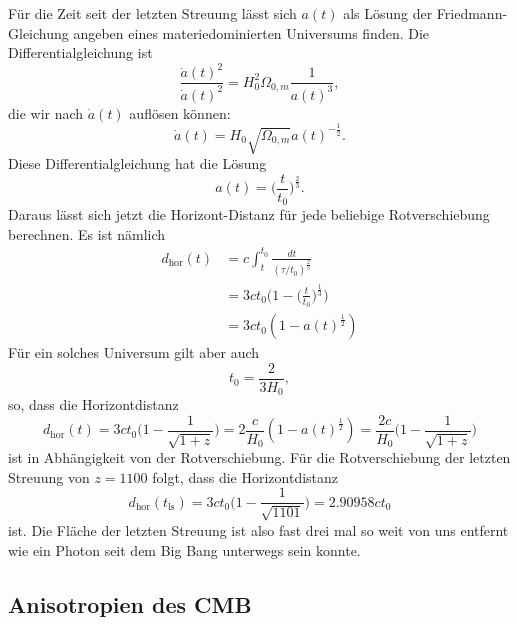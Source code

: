 Für die Zeit seit der letzten Streuung lässt sich $a(t)$ als
Lösung der Friedmann-Gleichung angeben eines materiedominierten
Universums finden.
Die Differentialgleichung ist
\[
\frac{\dot a(t)^2}{\dot a(t)^2}
=
H_0^2\Omega_{0,m}\frac1{a(t)^3},
\]
die wir nach $\dot a(t)$ auflösen können:
\[
\dot a(t)
=
H_0\sqrt{\Omega_{0,m}} a(t)^{-\frac12}.
\]
Diese Differentialgleichung hat die Lösung
\[
a(t) = \biggl(\frac{t}{t_0}\biggr)^\frac23.
\]
Daraus lässt sich jetzt die Horizont-Distanz für jede beliebige 
Rotverschiebung berechnen.
Es ist nämlich
\begin{align*}
d_{\text{hor}}(t)
&=
c\int_t^{t_0} \frac{dt}{(\tau/t_0)^\frac23}
\\
&=
3ct_0\biggl(1-\biggl(\frac{t}{t_0}\biggr)^\frac13\biggr)
\\
&=
3ct_0(1-a(t)^\frac12)
\end{align*}
Für ein solches Universum gilt aber auch 
\[
t_0=\frac{2}{3H_0},
\]
so, dass die Horizontdistanz
\[
d_{\text{hor}}(t)
=
3ct_0\biggl(1-\frac1{\sqrt{1+z}}\biggr)
=
2\frac{c}{H_0}(1-a(t)^\frac12)
=
\frac{2c}{H_0}\biggl(1-\frac{1}{\sqrt{1+z}}\biggr)
\]
ist in Abhängigkeit von der Rotverschiebung.
Für die Rotverschiebung der letzten Streuung von $z=1100$ folgt, dass
die Horizontdistanz
\[
d_{\text{hor}}(t_{\text{ls}})
=
3ct_0 \biggl(1-\frac{1}{\sqrt{1101}}\biggr)
=
2.90958 ct_0
\]
ist.
Die Fläche der letzten Streuung ist also fast drei mal so weit von uns
entfernt wie ein Photon seit dem Big Bang unterwegs sein konnte.


\subsection{Anisotropien des CMB}







